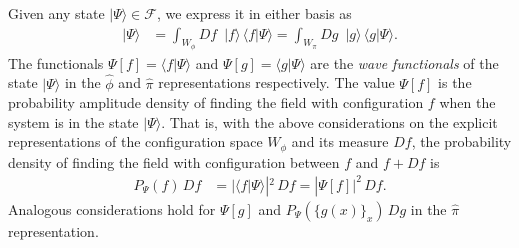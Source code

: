 \documentclass[../QFT_main.tex]{subfiles}
\begin{document}
\begin{mytheorem}
Given any state $|\Psi\rangle \in \mathcal{F}$, we express it in either basis as
\begin{align}
    |\Psi\rangle &= \int_{W_{\phi}} \!\!\!Df\,\, \,|f\rangle \, \langle f | \Psi \rangle 
    = \int_{W_{\pi}} \!\!\!Dg\,\,\, |g\rangle \, \langle g | \Psi \rangle.
\end{align}
The functionals $\Psi[f] = \langle f | \Psi \rangle$ and $\Psi[g] = \langle g | \Psi \rangle$ are the \emph{wave functionals} of the state $|\Psi\rangle$ in the $\hat{\phi}$ and $\hat{\pi}$ representations respectively.
%
The value $\Psi[f]$ is the probability amplitude density of finding the field with configuration $f$ when the system is in the state $|\Psi\rangle$.
That is, with the above considerations on the explicit representations of the configuration space $W_\phi$ and its measure $Df$, the probability density of finding the field with configuration between $f$ and $f+Df$ is
\begin{align}
    P_{\Psi}(f) \,Df &= |\langle f | \Psi \rangle|^2 \,Df = |\Psi[f]|^2 \,Df.
\end{align}
Analogous considerations hold for $\Psi[g]$ and $P_{\Psi}(\{g(x)\}_x) \,Dg$ in the $\hat{\pi}$ representation.
%
\end{mytheorem}
\end{document}
